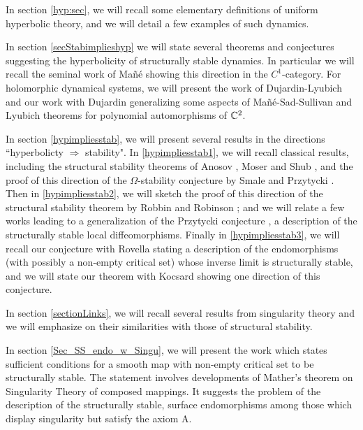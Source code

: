\documentclass[11pt,openany,leqno]{article}
\begin{document}
In section \ref{hyp:sec}, we will recall some elementary definitions of uniform hyperbolic theory, and we will detail a few examples of such dynamics.  

In section \ref{secStabimplieshyp} we will state several theorems and conjectures suggesting the hyperbolicity of structurally stable dynamics. In particular we will recall the seminal work of Ma\~n\'e \cite{Ma88} showing this direction in the $C^1$-category. For holomorphic dynamical systems, we will present the work of Dujardin-Lyubich \cite{LD13}  and our work with Dujardin \cite{BD14} generalizing some aspects of 
Ma\~ n\'e-Sad-Sullivan and Lyubich theorems \cite{MSS, 
Ly84} for polynomial  automorphisms of $\mathbb C^2$. 

In section \ref{hypimpliesstab}, we will present several results in the directions ``hyperbolicty $\Rightarrow$ stability". In \textsection \ref{hypimpliesstab1}, we will recall classical results, including the structural stability theorems  of Anosov \cite{An67}, Moser\cite{Mo69} and Shub \cite{Shub69}, and the proof of this direction of the $\Omega$-stability conjecture by Smale\cite{Sm68} and Przytycki  \cite{Pr77}. 
Then in \textsection \ref{hypimpliesstab2}, we will sketch the  proof of this direction of  the structural stability theorem by Robbin \cite{Ro71} and Robinson \cite{Ro76} ; and we will relate a few works leading to a generalization of the Przytycki  conjecture \cite{Pr77}, a description of the structurally stable local diffeomorphisms. Finally in \textsection \ref{hypimpliesstab3}, we will recall our conjecture with Rovella \cite{BR13} stating a description of the endomorphisms (with possibly a non-empty critical set) whose inverse limit is structurally stable, and we will state our theorem with Kocsard \cite{BK13} showing one direction of this conjecture. 

In section \ref{sectionLinks}, we will recall several results from singularity theory and we will emphasize on their similarities with those of structural stability.

In section \ref{Sec_SS_endo_w_Singu}, we will present the work
\cite{Be12} which  states sufficient conditions for a smooth map with non-empty critical set to be structurally stable.  The statement involves developments of 
Mather's theorem on Singularity Theory of composed mappings. It suggests the problem of the description of the structurally stable, surface endomorphisms among those which display singularity but satisfy the axiom A. 
\end{document}
